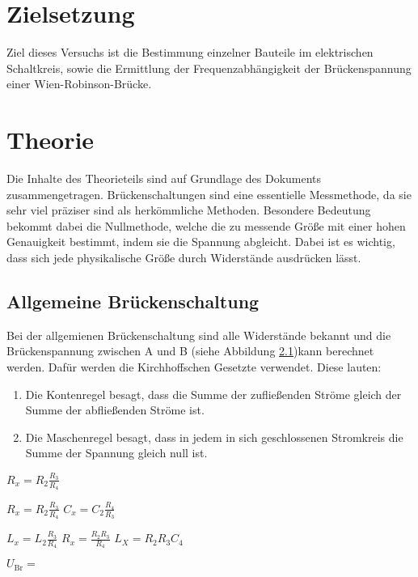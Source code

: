 \section{Zielsetzung}
Ziel dieses Versuchs ist die Bestimmung einzelner Bauteile im elektrischen Schaltkreis,
sowie die Ermittlung der Frequenzabhängigkeit der Brückenspannung einer Wien-Robinson-Brücke.

\section{Theorie}
\label{sec:Theorie}
Die Inhalte des Theorieteils sind auf Grundlage des Dokuments \cite{V302_Anleitung} zusammengetragen.
Brückenschaltungen sind eine essentielle Messmethode, da sie sehr viel präziser sind als herkömmliche Methoden.
Besondere Bedeutung bekommt dabei die Nullmethode, welche die zu messende Größe mit einer hohen Genauigkeit bestimmt,
indem sie die Spannung abgleicht.
Dabei ist es wichtig, dass sich jede physikalische Größe durch Widerstände ausdrücken lässt.
\subsection{Allgemeine Brückenschaltung}
Bei der allgemienen Brückenschaltung sind alle Widerstände bekannt und die Brückenspannung zwischen A und B (siehe
Abbildung \ref{})kann berechnet werden.
Dafür werden die Kirchhoffschen Gesetzte verwendet.
Diese lauten:
\begin{enumerate}
    \item Die Kontenregel besagt, dass die Summe der zufließenden Ströme gleich der Summe der abfließenden Ströme ist.
    \item Die Maschenregel besagt, dass in jedem in sich geschlossenen Stromkreis die Summe der Spannung gleich null ist.
\end{enumerate}

$R_x=R_2\frac{R_3}{R_4}$

$R_x=R_2\frac{R_3}{R_4}$
$C_x=C_2\frac{R_4}{R_3}$

$L_x=L_2\frac{R_3}{R_4}$
$R_x=\frac{R_2R_3}{R_4}$
$L_X=R_2R_3C_4$

$U_\text{Br}=\frac{}{}$




